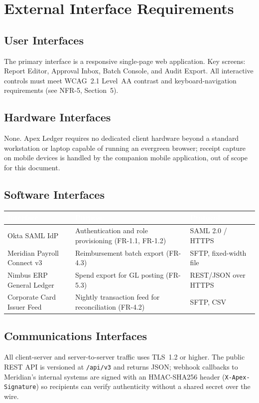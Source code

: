\section{External Interface Requirements}

\subsection{User Interfaces}
The primary interface is a responsive single-page web application. Key screens: Report
Editor, Approval Inbox, Batch Console, and Audit Export. All interactive controls must meet
WCAG~2.1 Level~AA contrast and keyboard-navigation requirements (see NFR-5, Section~5).

\subsection{Hardware Interfaces}
None. Apex Ledger requires no dedicated client hardware beyond a standard workstation or
laptop capable of running an evergreen browser; receipt capture on mobile devices is handled
by the companion mobile application, out of scope for this document.

\subsection{Software Interfaces}
\begin{center}
\small
\begin{tabularx}{\textwidth}{@{}l X l@{}}
\toprule
\rowcolor{navydark}
\textcolor{white}{\textbf{Interface}} & \textcolor{white}{\textbf{Purpose}} & \textcolor{white}{\textbf{Protocol}} \\
\midrule
Okta SAML IdP & Authentication and role provisioning (FR-1.1, FR-1.2) & SAML 2.0 / HTTPS \\
\rowcolor{lightgray}
Meridian Payroll Connect v3 & Reimbursement batch export (FR-4.3) & SFTP, fixed-width file \\
Nimbus ERP General Ledger & Spend export for GL posting (FR-5.3) & REST/JSON over HTTPS \\
\rowcolor{lightgray}
Corporate Card Issuer Feed & Nightly transaction feed for reconciliation (FR-4.2) & SFTP, CSV \\
\bottomrule
\end{tabularx}
\end{center}

\subsection{Communications Interfaces}
All client-server and server-to-server traffic uses TLS~1.2 or higher. The public REST API is
versioned at \texttt{/api/v3} and returns JSON; webhook callbacks to Meridian's internal
systems are signed with an HMAC-SHA256 header (\texttt{X-Apex-Signature}) so recipients can
verify authenticity without a shared secret over the wire.

